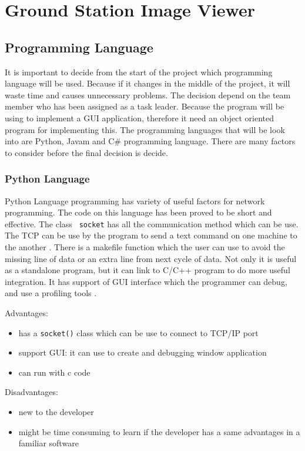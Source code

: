 \section{Ground Station Image Viewer}

\subsection{Programming Language}

It is important to decide from the start of the project which programming language will be used.
Because if it changes in the middle of the project, it will waste time and causes unnecessary problems.
The decision depend on the team member who has been assigned as a task leader.
Because the program will be using to implement a GUI application, therefore it need an object oriented program for implementing this.
The programming languages that will be look into are Python, Javam and C\# programming language.
There are many factors to consider before the final decision is decide.

\subsubsection*{Python Language}
Python Language programming has variety of useful factors for network programming. 
The code on this language has been proved to be short and effective.
The class \texttt{ socket} has all the communication method which can be use. 
The TCP can be use by the program to send a text command on one machine to the another \cite{normanM}. 
There is a makefile function which the user can use to avoid the missing line of data or an extra line from next cycle of data\cite{normanM,guidoR}. Not only it is useful as a standalone program, but it can link to C/C++ program to do more useful integration.
It has support of GUI interface which the programmer can debug, and use a profiling tools \cite{sannerM}. 

Advantages:
\begin{itemize}
\item has a \texttt{socket()} class which can be use to connect to TCP/IP port
\item support GUI: it can use to create and debugging window application
\item can run with c code
\end{itemize}

Disadvantages:
\begin{itemize}
\item new to the developer
\item might be time consuming to learn if the developer has a same advantages in a familiar software
\end{itemize}

